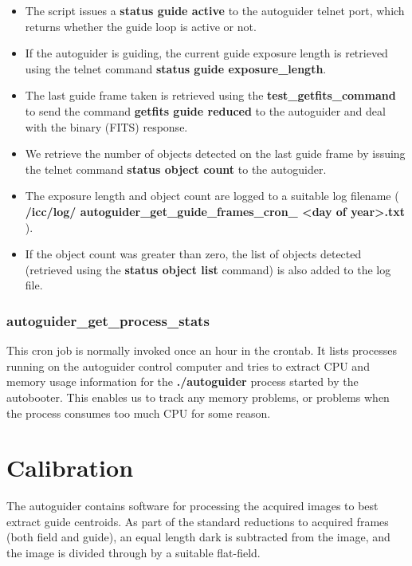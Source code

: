 \documentclass[10pt,a4paper]{article}
\begin{document}
\begin{itemize}
\item The script issues a {\bf status guide active} to the autoguider telnet port, which returns whether the guide loop is active or not.
\item If the autoguider is guiding, the current guide exposure length is  retrieved using the telnet command {\bf status guide exposure\_length}. 
\item The last guide frame taken is retrieved using the {\bf test\_getfits\_command} to send the command {\bf getfits guide reduced} to the autoguider and deal with the binary (FITS) response.
\item We retrieve the number of objects detected on the last guide frame by issuing the telnet command {\bf status object count} to the autoguider.
\item The exposure length and object count are logged to a suitable log filename  ( {\bf /icc/log/ autoguider\_get\_guide\_frames\_cron\_ \textless day of year\textgreater .txt} ).
\item If the object count was greater than zero, the list of objects detected (retrieved using the {\bf status object list} command) is also added to the log file.
\end{itemize}

\subsubsection{autoguider\_get\_process\_stats}

This cron job is normally invoked once an hour in the crontab. It lists processes running on the autoguider control computer and tries to extract CPU and memory usage information for the {\bf ./autoguider} process started by the autobooter. This enables us to track any memory problems, or problems when the process consumes too much CPU for some reason.



\section{Calibration}

The autoguider contains software for processing the acquired images to best extract guide centroids. As part of the standard reductions to acquired frames (both field and guide), an equal length dark is subtracted from the image, and the image is divided through by a suitable flat-field.
\end{document}
